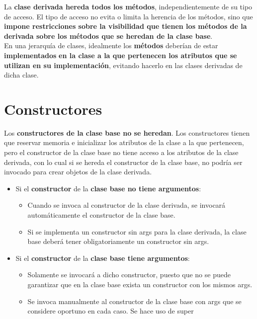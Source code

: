 \documentclass{article}
\begin{document}
La \textbf{clase derivada hereda todos los métodos}, independientemente de su tipo de acceso. El tipo de acceso no evita o limita la herencia de los métodos, sino que \textbf{impone restricciones sobre la visibilidad que tienen los métodos de la derivada sobre los métodos que se heredan de la
clase base}. \\

En una jerarquía de clases, idealmente los \textbf{métodos} deberían de estar \textbf{implementados} \textbf{en la clase a la que pertenecen los atributos que se utilizan en su implementación}, evitando hacerlo en las clases derivadas de dicha clase.

\newpage

\section{Constructores}
Los \textbf{constructores de la clase base no se heredan}. Los constructores tienen que reservar memoria e inicializar los atributos de la clase a la que pertenecen, pero el constructor de la clase base no tiene acceso a los atributos de la clase derivada, con lo cual si se hereda el constructor de la clase base, no podría ser invocado para crear objetos de la clase derivada.

\begin{itemize}
    \item Si el \textbf{constructor} de la \textbf{clase base no tiene argumentos}:
        \begin{itemize}
            \item Cuando se invoca al constructor de la clase derivada, se invocará automáticamente el constructor de la clase base.
            \item Si se implementa un constructor sin args para la clase derivada, la clase base deberá tener obligatoriamente un constructor sin args.
        \end{itemize}

    \item Si el \textbf{constructor} de la \textbf{clase base tiene argumentos}:
        \begin{itemize}
            \item Solamente se invocará a dicho constructor, puesto que no se puede garantizar que en la clase base exista un constructor con los mismos args.
             \item Se invoca manualmente al constructor de la clase base con args que se considere oportuno en cada caso. Se hace uso de super
        \end{itemize}
\end{itemize}
\end{document}
